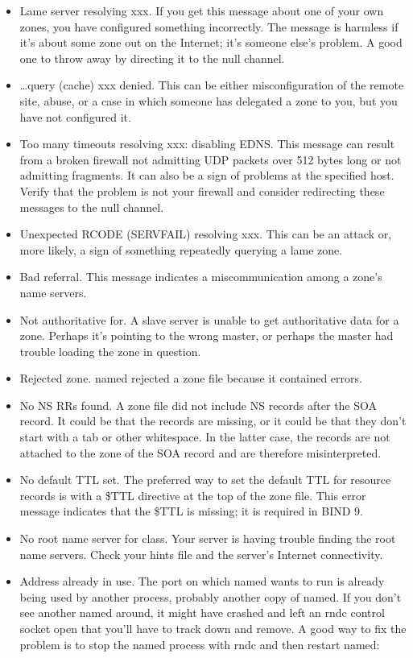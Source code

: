 \begin{itemize}
\item
  \protect\hypertarget{part0024_split_070.htmlux5cux23_idIndexMarker2288}{}{}\protect\hypertarget{part0024_split_070.htmlux5cux23_idIndexMarker2289}{}{}{Lame
  server resolving xxx.} If you get this message about one of your own
  zones, you have configured something incorrectly. The message is
  harmless if it's about some zone out on the Internet; it's someone
  else's problem. A good one to throw away by directing it to the {null}
  channel.
\item
  { \ldots query (cache) xxx denied}. This can be either
  misconfiguration of the remote site, abuse, or a case in which someone
  has delegated a zone to you, but you have not configured it.
\item
  {Too many timeouts resolving xxx: disabling EDNS}. This message can
  result from a broken firewall not admitting UDP packets over 512 bytes
  long or not admitting fragments. It can also be a sign of problems at
  the specified host. Verify that the problem is not your firewall and
  consider redirecting these messages to the null channel.
\item
  {Unexpected RCODE
  (}{\protect\hypertarget{part0024_split_070.htmlux5cux23_idIndexMarker2290}{}{}}{SERVFAIL)
  resolving xxx}. This can be an attack or, more likely, a sign of
  something repeatedly querying a lame zone.
\item
  {Bad referral}. This message indicates a miscommunication among a
  zone's name servers.
\item
  {Not authoritative for}. A slave server is unable to get authoritative
  data for a zone. Perhaps it's pointing to the wrong master, or perhaps
  the master had trouble loading the zone in question.
\item
  {Rejected zone}. {named} rejected a zone file because it contained
  errors.
\item
  {No NS RRs found}. A zone file did not include NS records after the
  SOA record. It could be that the records are missing, or it could be
  that they don't start with a tab or other whitespace. In the latter
  case, the records are not attached to the zone of the SOA record and
  are therefore misinterpreted.
\item
  {No default TTL set}. The preferred way to set the default TTL for
  resource records is with a {\$TTL} directive at the top of the zone
  file. This error message indicates that the {\$TTL} is missing; it is
  required in BIND 9.
\item
  {No root name server for class}. Your server is having trouble finding
  the root name servers. Check your hints file and the server's Internet
  connectivity.
\item
  {Address already in use}. The port on which {named} wants to run is
  already being used by another process, probably another copy of
  {named}. If you don't see another {named} around, it might have
  crashed and left an {rndc} control socket open that you'll have to
  track down and remove. A good way to fix the problem is to stop the
  {named} process with {rndc} and then restart {named}:
\end{itemize}

